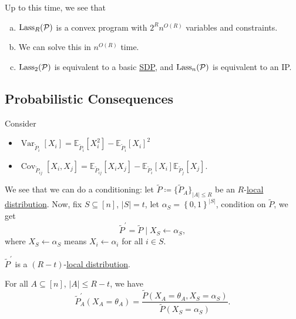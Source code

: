 Up to this time, we see that
\begin{enumerate}[(a)]
	\item \(\mathop{\mathrm{Lass}}_R(\mathcal{\MakeUppercase{p}})\) is a convex program with \(2^R n^{O(R)}\) variables and constraints.
	\item We can solve this in \(n^{O(R)}\) time.
	\item \(\mathop{\mathrm{Lass}}_2(\mathcal{\MakeUppercase{p}})\) is equivalent to a basic \hyperref[def:SDP]{SDP}, and \(\mathop{\mathrm{Lass}}_n(\mathcal{\MakeUppercase{p}})\) is equivalent to an IP.
\end{enumerate}

\subsection{Probabilistic Consequences}
Consider
\begin{itemize}
	\item \(\mathop{\mathrm{Var}}_{\widetilde{P} _i}\left[ X_i \right] = \mathbb{E}_{\widetilde{P} _i}\left[ X_i ^{2} \right] - \mathbb{E}_{\widetilde{P} _i}\left[ X_i \right]^{2}  \)
	\item \(\mathop{\mathrm{Cov}}_{\widetilde{P} _{ij}}\left[ X_i, X_j\right] = \mathbb{E}_{\widetilde{P} _{ij}}\left[ X_i X_j\right] - \mathbb{E}_{\widetilde{P} _{i}}\left[ X_i \right] \mathbb{E}_{\widetilde{P} _{j}}\left[ X_j\right]  \).
\end{itemize}
We see that we can do a conditioning: let \(\widetilde{P} \coloneqq \{ \widetilde{P} _{A} \} _{\left\vert A \right\vert \leq R}\) be an \(R\)-\hyperref[def:local-distribution]{local distribution}. Now, fix \(S \subseteq [n]\), \(\left\vert S \right\vert = t\), let \(\alpha _S = \left\{ 0, 1 \right\} ^{\left\vert S \right\vert }\), condition on \(\widetilde{P} \), we get
\[
	\widetilde{P} ^\prime = \widetilde{P} \mid X_S \gets \alpha _S,
\]
where \(X_S\gets \alpha _S\) means \(X_i \gets \alpha _i\) for all \(i\in S\).
\begin{remark}
	\(\widetilde{P} ^\prime \) is a \((R-t)\)-\hyperref[def:local-distribution]{local distribution}.
\end{remark}
\begin{explanation}
	For all \(A \subseteq [n]\), \(\left\vert A \right\vert \leq R-t\), we have
	\[
		\widetilde{P} ^\prime _A (X_A = \theta _A) = \frac{\widetilde{P} (X_A = \theta _A, X_S = \alpha _S)}{\widetilde{P} (X_S = \alpha _S)}.
	\]
\end{explanation}

